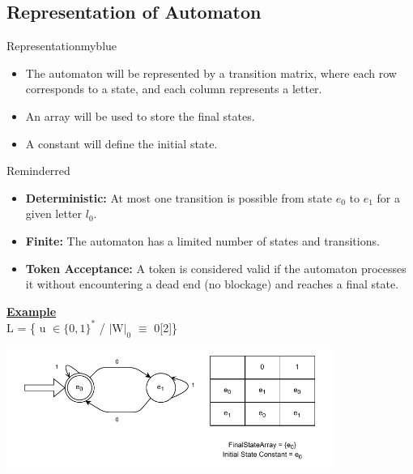 \vspace{0.5cm}

\subsection{Representation of Automaton}

\begin{prettyBox}{Representation}{myblue}
\begin{itemize}
    \item The automaton will be represented by a transition matrix, where each row corresponds to a state, and each column represents a letter.
    \item An array will be used to store the final states.
    \item A constant will define the initial state.
\end{itemize}
\end{prettyBox}

\vspace{0.75cm}

\begin{prettyBox}{Reminder}{red}
    \begin{itemize}
        \item \textbf{Deterministic:} At most one transition is possible from state \( e_0 \) to \( e_1 \) for a given letter \( l_0 \).  
        \item \textbf{Finite:} The automaton has a limited number of states and transitions.  
        \item \textbf{Token Acceptance:} A token is considered valid if the automaton processes it without encountering a dead end (no blockage) and reaches a final state.  
    \end{itemize}
\end{prettyBox}

\newpage
\null

\textbf{\underline{Example}}\\[0.5cm]
L = \{ u \(\in \{0,1\}^{*}\) / \(|\text{W}|_{0}\) \(\equiv\) 0[2]\}

\vspace{0.15cm}

\begin{center}
    \includegraphics[width=0.8\textwidth]{Chapters/Examples/Lexi/ex1.drawio.pdf}
\end{center}

